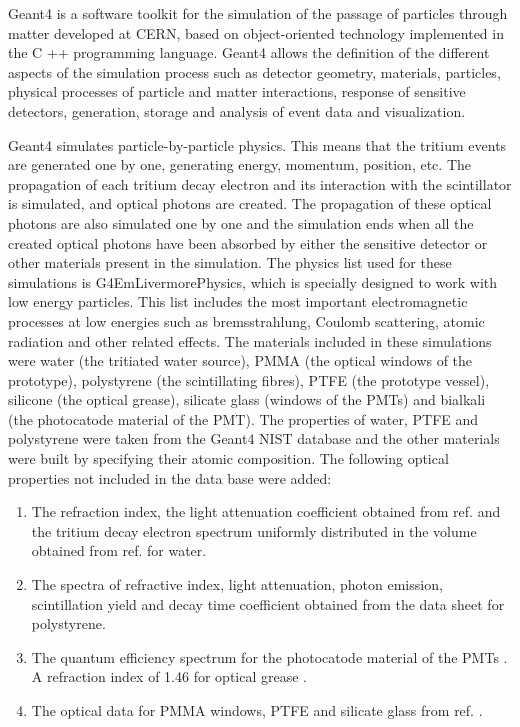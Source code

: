 Geant4 is a software toolkit for the simulation of the passage of particles through matter developed at CERN, based on object-oriented technology implemented in the C ++ programming language. Geant4 allows the definition of the different aspects of the simulation process such as detector geometry, materials, particles, physical processes of particle and matter interactions, response of sensitive detectors, generation, storage and analysis of event data and visualization.

Geant4 simulates particle-by-particle physics. This means that the tritium events are generated one by one, generating energy, momentum, position, etc. The propagation of each tritium decay electron and its interaction  with the scintillator is simulated, and optical photons are created. The propagation of these optical photons are also simulated one by one and the simulation ends when all the created optical photons have been absorbed by either the sensitive detector or other materials present in the simulation. The physics list used for these simulations is G4EmLivermorePhysics, which is specially designed to work with low energy particles. This list includes the most important electromagnetic processes at low energies such as bremsstrahlung, Coulomb scattering, atomic radiation and other related effects. The materials included in these simulations were water (the tritiated water source), PMMA (the optical windows of the prototype), polystyrene (the scintillating fibres), PTFE (the prototype vessel), silicone (the optical grease), silicate glass (windows of the PMTs) and bialkali (the photocatode material of the PMT). The properties of water, PTFE and polystyrene were taken from the Geant4 NIST database and the other materials were built by specifying their atomic composition. The following optical properties not included in the data base were added:

\begin{enumerate}
%
\item{} The refraction index, the light attenuation coefficient obtained from ref. \cite{WaterPropertiesSimulation} and the tritium decay electron spectrum uniformly distributed in the volume obtained from ref. \cite{TritiumEmissionSpectrum} for water. 

\item{} The spectra of refractive index, light attenuation, photon emission, scintillation yield and decay time coefficient obtained from the data sheet \cite{DataSheetBCF12Fiber} for polystyrene.

\item{} The quantum efficiency spectrum for the photocatode material of the PMTs \cite{DataSheetPMTs}. A refraction index of 1.46 for optical grease \cite{OpticalGrease}.

\item{} The optical data for PMMA windows, PTFE and silicate glass from ref. \cite{NEMODataSimulation}.

\end{enumerate} 